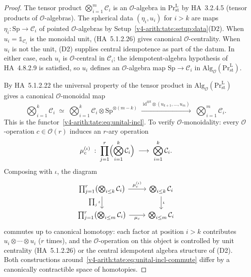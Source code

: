 \begin{proof}
The tensor product \(\bigotimes_{i=1}^{m}\mathcal{C}_{i}\) is an
\(\mathcal{O}\)-algebra in \(\mathrm{Pr}^{\mathrm{L}}_{\mathrm{st}}\) by
HA~3.2.4.5 (tensor products of \(\mathcal{O}\)-algebras). The spherical
data \((\eta_{i},u_{i})\) for \(i>k\) are maps
\(\eta_{i}\colon\mathrm{Sp}\to\mathcal{C}_{i}\) of pointed
\(\mathcal{O}\)-algebras by Setup~\ref{v4-arith:tate:setup:data}(D2).
When \(u_{i}=\mathbb{1}_{\mathcal{C}_{i}}\) is the monoidal unit,
 (HA~5.1.2.26) gives canonical
\(\mathcal{O}\)-centrality. When \(u_{i}\) is not the unit, (D2) supplies
central idempotence as part of the datum. In either case, each
\(u_{i}\) is \(\mathcal{O}\)-central in \(\mathcal{C}_{i}\); the
idempotent-algebra hypothesis of HA~4.8.2.9 is satisfied, so
\(u_{i}\) defines an \(\mathcal{O}\)-algebra map
\(\mathrm{Sp}\to\mathcal{C}_{i}\) in \(\mathrm{Alg}_{\mathcal{O}}(\mathrm{Pr}^{\mathrm{L}}_{\mathrm{st}})\).

By HA~5.1.2.22 the universal property of the tensor product in
\(\mathrm{Alg}_{\mathcal{O}}(\mathrm{Pr}^{\mathrm{L}}_{\mathrm{st}})\)
gives a canonical \(\mathcal{O}\)-monoidal map
\[
\bigotimes_{i=1}^{k}\mathcal{C}_{i}\;\simeq\;\bigotimes_{i=1}^{k}\mathcal{C}_{i}\otimes\mathrm{Sp}^{\otimes(m-k)}\;\xrightarrow{\;\mathrm{id}^{\otimes k}\otimes(u_{k+1},\ldots,u_{m})\;}\;\bigotimes_{i=1}^{m}\mathcal{C}_{i}.
\]
This is the functor~\eqref{v4-arith:tate:eq:unital-incl}. To verify
\(\mathcal{O}\)-monoidality: every \(\mathcal{O}\)-operation
\(c\in\mathcal{O}(r)\) induces an \(r\)-ary operation
\[
\mu_{c}^{(\iota)}\;:\;\prod_{j=1}^{r}\Bigl(\bigotimes_{i=1}^{k}\mathcal{C}_{i}\Bigr)\;\longrightarrow\;\bigotimes_{i=1}^{k}\mathcal{C}_{i}.
\]
Composing with \(\iota\), the diagram
\begin{equation}
\label{v4-arith:tate:eq:unital-incl-commute}
\begin{tikzcd}
\prod_{j=1}^{r}\bigl(\bigotimes_{i\leq k}\mathcal{C}_{i}\bigr) \ar[d, "\prod_{j}\iota"'] \ar[r, "\mu_{c}^{(\iota)}"] & \bigotimes_{i\leq k}\mathcal{C}_{i} \ar[d, "\iota"] \\
\prod_{j=1}^{r}\bigl(\bigotimes_{i\leq m}\mathcal{C}_{i}\bigr) \ar[r, "\mu_{c}"'] & \bigotimes_{i\leq m}\mathcal{C}_{i}
\end{tikzcd}
\end{equation}
commutes up to canonical homotopy: each factor at position \(i>k\)
contributes \(u_{i}\otimes\cdots\otimes u_{i}\) (\(r\) times), and the
\(\mathcal{O}\)-operation on this object is controlled by unit centrality
(HA~5.1.2.26) or the central idempotent algebra structure of (D2).
Both constructions around~\eqref{v4-arith:tate:eq:unital-incl-commute} differ
by a canonically contractible space of homotopies.
\end{proof}


